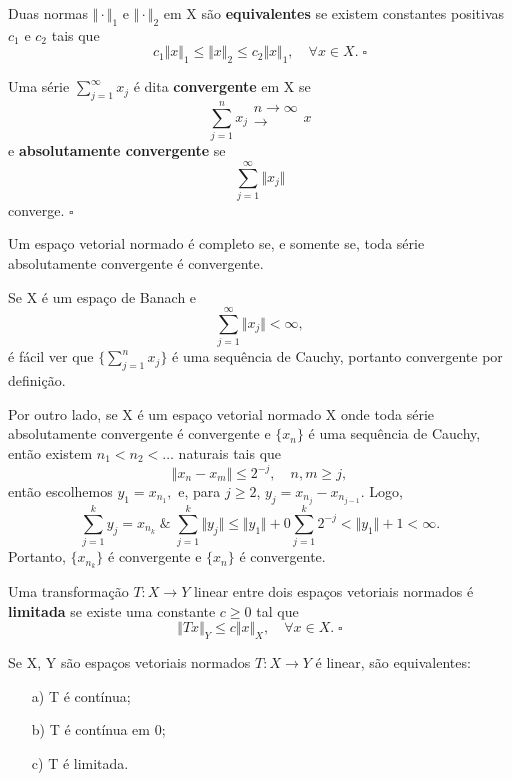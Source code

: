 \documentclass[../functional_analysis.tex]{subfiles}
\begin{document}
\begin{def*}
	Duas normas \(\Vert \cdot  \Vert_{1}\) e \(\Vert \cdot \Vert_{2}\) em X são \textbf{equivalentes} se existem constantes positivas \(c_1\) e \(c_2\) tais que
	\[
		c_1 \Vert x \Vert_1 \leq \Vert x \Vert_2 \leq c_2\Vert x \Vert_1,\quad \forall x\in X.\; \square
	\]
\end{def*}
\begin{def*}
	Uma série \(\sum\limits_{j=1}^{\infty}x_{j}\) é dita \textbf{convergente} em X se
	\[
		\sum\limits_{j=1}^{n}x_{j}\substack{n\to \infty \\ \longrightarrow \\ }x
	\]
	e \textbf{absolutamente convergente} se
	\[
		\sum\limits_{j=1}^{\infty}\Vert x_{j} \Vert
	\]
	converge. \(\square\)
\end{def*}
\begin{theorem*}
	Um espaço vetorial normado é completo se, e somente se, toda série absolutamente convergente é convergente.
\end{theorem*}
\begin{proof*}
	Se X é um espaço de Banach e
	\[
		\sum\limits_{j=1}^{\infty}\Vert x_{j} \Vert<\infty,
	\]
	é fácil ver que \(\biggl\{ \sum\limits_{j=1}^{n}x_{j}\biggr\}\) é uma sequência de Cauchy, portanto convergente por definição.

	Por outro lado, se X é um espaço vetorial normado X onde toda série absolutamente convergente é convergente e \(\{x_{n}\}\) é uma sequência de Cauchy, então existem \(n_1<n_2<\dotsc \) naturais tais que
	\[
		\Vert x_{n}-x_{m} \Vert\leq 2^{-j},\quad n, m\geq j,
	\]
	então escolhemos \(y_1=x_{n_1},\) e, para \(j\geq 2\), \(y_{j}=x_{n_{j}}-x_{n_{j-1}}\).
	Logo,
	\[
		\sum\limits_{j=1}^{k}y_{j}=x_{n_{k}}\;\&\; \sum\limits_{j=1}^{k}\Vert y_{j} \Vert\leq \Vert y_1 \Vert +0\sum\limits_{j=1}^{k}2^{-j}<\Vert y_1 \Vert + 1 < \infty.
	\]
	Portanto, \(\{x_{n_{k}}\}\) é convergente e \(\{x_{n}\}\) é convergente. \qedsymbol
\end{proof*}
\begin{def*}
	Uma transformação \(T:X\rightarrow Y\) linear entre dois espaços vetoriais normados é \textbf{limitada} se existe uma constante \(c\geq 0\) tal que
	\[
		\Vert Tx \Vert_{Y}\leq c \Vert x \Vert_{X}, \quad \forall x\in X.\; \square
	\]
\end{def*}
\begin{prop*}
	Se X, Y são espaços vetoriais normados \(T:X\rightarrow Y\) é linear, são equivalentes:
	\begin{itemize}
		\item[a)] T é contínua;
		\item[b)] T é contínua em 0;
		\item[c)] T é limitada.
	\end{itemize}
\end{prop*}
\end{document}
